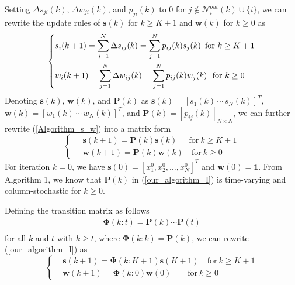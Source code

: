 \documentclass{IEEEtran}
\begin{document}
Setting $\Delta s_{ji}(k)$, $\Delta w_{ji}(k)$, and $p_{ji}(k)$ to $0$ for $j\notin \mathcal{N}_i^{out}(k)\cup \{i\}$, we can rewrite the update rules of $\mathbf{s}(k)$ for $k\geq K+1$ and $\mathbf{w}(k)$ for $k\geq 0$ as
\begin{equation}\label{Algorithm_s_w}
	\left\lbrace \begin{aligned}
		& s_i(k+1) = \sum_{j=1}^N \Delta s_{ij}(k) = \sum_{j=1}^N p_{ij}(k)s_j(k) \ \, \textnormal{for} \ k \geq K+1 \\
		& w_i(k+1) = \sum_{j=1}^N \Delta w_{ij}(k)=\sum_{j=1}^N p_{ij}(k)w_j(k) \ \ \textnormal{for} \ k \geq 0
	\end{aligned} \right.
\end{equation}
Denoting $\mathbf{s}(k)$, $\mathbf{w}(k)$, and $\mathbf{P}(k)$ as $\mathbf{s}(k)= [s_1(k)\, \cdots \, s_N(k)] ^T$, $\mathbf{w}(k)= [w_1(k) \, \cdots \, w_N(k)]^T$, and $\mathbf{P}(k)=[p_{ij}(k)]_{N\times N}$, we can further rewrite (\ref{Algorithm_s_w}) into a matrix form
\begin{equation}\label{our_algorithm_I}
\left\lbrace \begin{aligned}
& \ \mathbf{s}(k+1) =\mathbf{P}(k) \mathbf{s}(k) \quad \ \ \text{for} \ k \geq K+1 \\
& \ \mathbf{w}(k+1) = \mathbf{P}(k) \mathbf{w}(k) \quad \text{for} \ k \geq 0
\end{aligned} \right.
\end{equation}
For iteration $k=0$, we have $\mathbf{s}(0)= [x_1^0, x_2^0, \ldots, x_N^0] ^T$ and $\mathbf{w}(0)= \mathbf{1}$. From Algorithm 1, we know that $\mathbf{P}(k)$ in (\ref{our_algorithm_I}) is time-varying and column-stochastic for $k \geq 0$.

Defining the transition matrix as follows
\begin{equation}\label{transition_matrix}
\begin{aligned}
\mathbf{\Phi}(k:t) =\mathbf{P}(k) \cdots\mathbf{P}(t)\\
\end{aligned}
\end{equation}
for all $k$ and $t$ with $k \geq t$, where $\mathbf{\Phi}(k:k)=\mathbf{P}(k)$, we can rewrite (\ref{our_algorithm_I}) as
\begin{equation}\label{Algorithm_I_second_half}
\left\lbrace \begin{aligned}
& \mathbf{s}(k+1) = \mathbf{\Phi}(k:K+1) \mathbf{s}(K+1) \quad \text{for} \ k \geq K+1 \\
& \mathbf{w}(k+1) = \mathbf{\Phi}(k:0) \mathbf{w}(0) \qquad \text{for} \ k \geq 0
\end{aligned} \right.
\end{equation}
\end{document}
